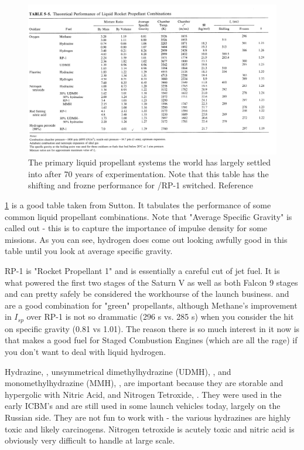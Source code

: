 \documentclass[twocolumn]{memoir} %
\begin{document}
\begin{figure}
    \includegraphics[width=\textwidth]{sutton_propellants}
    \caption{The primary liquid propellant systems the world has largely settled into
    after 70 years of experimentation.  Note that this table has the shifting and
    frozne performance for /RP-1 switched.  Reference \cite{sutton}}
    \label{table:prop_combos}
\end{figure}

\cref{table:prop_combos} is a good table taken from Sutton.  It tabulates the performance
of some common liquid propellant combinations. 
Note that "Average Specific Gravity" is called out - this is to capture the importance of
impulse density for some missions.  As you can see, hydrogen does come out looking awfully
good in this table until you look at average specific gravity.  

RP-1 is "Rocket Propellant 1" and is essentially a careful cut of jet fuel.  It is what 
powered the first two stages of the Saturn V as well as both Falcon 9 stages and can pretty safely
be considered the workhourse of the launch business.   and  are
a good combination for "green" propellants, although Methane's improvement in $I_{sp}$
over RP-1 is not so drammatic (296 s vs. 285 s) when you consider the hit on specific
gravity (0.81 vs 1.01).  The reason there is so much interest in it now is that makes
a good fuel for Staged Combustion Engines (which are all the rage) if you don't want
to deal with liquid hydrogen.

Hydrazine, , unsymmetrical dimethylhydrazine (UDMH), , and 
monomethylhydrazine (MMH), , are important because they are storable 
and hypergolic with Nitric Acid,  
and Nitrogen Tetroxide, .  They were used in the early ICBM's and are still used in
some launch vehicles today, largely on the Russian side.  They are not fun to work
with - the various hydrazines are highly toxic and likely carcinogens.  Nitrogen 
tetroxide is acutely toxic and nitric acid is obviously very difficult to handle
at large scale.
\end{document}
